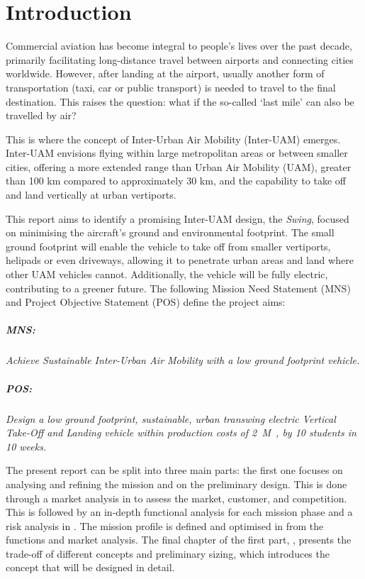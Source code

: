 \chapter{Introduction}
\label{ch:Introduction}

Commercial aviation has become integral to people’s lives over the past decade, primarily facilitating long-distance travel between airports and connecting cities worldwide. However, after landing at the airport, usually another form of transportation (taxi, car or public transport) is needed to travel to the final destination. This raises the question: what if the so-called \enquote*{last mile} can also be travelled by air?

This is where the concept of Inter-Urban Air Mobility (Inter-UAM) emerges. Inter-UAM envisions flying within large metropolitan areas or between smaller cities, offering a more extended range than Urban Air Mobility (UAM), greater than 100 km compared to approximately 30 km, and the capability to take off and land vertically at urban vertiports. 

This report aims to identify a promising Inter-UAM design, the \textit{Swing}, focused on minimising the aircraft’s ground and environmental footprint. The small ground footprint will enable the vehicle to take off from smaller vertiports, helipads or even driveways, allowing it to penetrate urban areas and land where other UAM vehicles cannot. Additionally, the vehicle will be fully electric, contributing to a greener future. The following Mission Need Statement (MNS) and Project Objective Statement (POS) define the project aims: 

\paragraph{MNS:} \textit{Achieve Sustainable Inter-Urban Air Mobility with a low ground footprint vehicle.}
\vspace{-5mm}
\paragraph{POS:} \textit{Design a low ground footprint, sustainable, urban transwing electric Vertical Take-Off and Landing vehicle within production costs of \qty[exponent-mode=input]{2}{M\texteuro}, by 10 students in 10 weeks.}

The present report can be split into three main parts: the first one focuses on analysing and refining the mission and on the preliminary design.
This is done through a market analysis in  to assess the market, customer, and competition.
This is followed by an in-depth functional analysis for each mission phase and a risk analysis in  .
The mission profile is defined and optimised in  from the functions and market analysis.
The final chapter of the first part, , presents the trade-off of different concepts and preliminary sizing, which introduces the concept that will be designed in detail.

